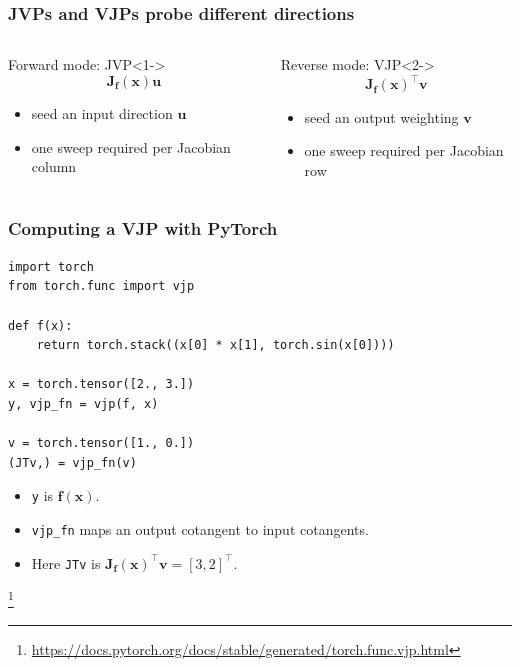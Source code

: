 \documentclass[]{article}
\newcommand\blfootnote[1]{%
  \begingroup
  \renewcommand\thefootnote{}\footnote{#1}%
  \addtocounter{footnote}{-1}%
  \endgroup
}
\begin{document}
\begin{frame}
\frametitle{JVPs and VJPs probe different directions}

\begin{columns}
	\begin{block}{Forward mode: JVP}<1->
		\begin{equation*}
			\bm{J}_{\bm{f}}(\bm{x})\bm{u}
		\end{equation*}
		\begin{itemize}
			\item seed an input direction $\bm{u}$
			\item one sweep required per  Jacobian column
		\end{itemize}
	\end{block}

	\begin{block}{Reverse mode: VJP}<2->
		\begin{equation*}
			\bm{J}_{\bm{f}}(\bm{x})^\top\bm{v}
		\end{equation*}
		\begin{itemize}
			\item seed an output weighting $\bm{v}$
			\item one sweep required per Jacobian row
		\end{itemize}
	\end{block}
\end{columns}

\vspace{0.5em}
\end{frame}


\begin{frame}[fragile]
\frametitle{Computing a VJP with PyTorch}

\begin{lstlisting}
import torch
from torch.func import vjp

def f(x):
    return torch.stack((x[0] * x[1], torch.sin(x[0])))

x = torch.tensor([2., 3.])
y, vjp_fn = vjp(f, x)

v = torch.tensor([1., 0.])
(JTv,) = vjp_fn(v)
\end{lstlisting}

\begin{itemize}
	\item<2-> \texttt{y} is $\bm{f}(\bm{x})$.
	\item<3-> \texttt{vjp\_fn} maps an output cotangent to input cotangents.
	\item<4-> Here \texttt{JTv} is $\bm{J}_{\bm{f}}(\bm{x})^\top\bm{v}=[3,2]^\top$.
\end{itemize}
\blfootnote{\url{https://docs.pytorch.org/docs/stable/generated/torch.func.vjp.html}}
\end{frame}
\end{document}
